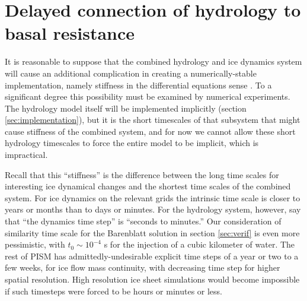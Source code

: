 \documentclass[11pt]{amsart}
\begin{document}
\section{Delayed connection of hydrology to basal resistance}  \label{app:delayedpw}  It is reasonable to suppose that the combined hydrology and ice dynamics system will cause an additional complication in creating a numerically-stable implementation, namely stiffness in the differential equations sense \citep{AscherPetzold}.  To a significant degree this possibility must be examined by numerical experiments.  The hydrology model itself will be implemented implicitly (section \ref{sec:implementation}), but it is the short timescales of that subsystem that might cause stiffness of the combined system, and for now we cannot allow these short hydrology timescales to force the entire model to be implicit, which is impractical.

Recall that this ``stiffness'' is the difference between the long time scales for interesting ice dynamical changes and the shortest time scales of the combined system.  For ice dynamics on the relevant grids the intrinsic time scale is closer to years or months than to days or minutes.  For the hydrology system, however, \citet{FlowersClarke2002_theory} say that ``the dynamics time step'' is ``seconds to minutes.''  Our consideration of similarity time scale for the Barenblatt solution in section \ref{sec:verif} is even more pessimistic, with $t_0\sim 10^{-4}$ s for the injection of a cubic kilometer of water.  The rest of PISM has admittedly-undesirable explicit time steps of a year or two to a few weeks, for ice flow mass continuity, with decreasing time step for higher spatial resolution.  High resolution ice sheet simulations would become impossible if such timesteps were forced to be hours or minutes or less.
\end{document}
